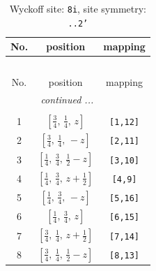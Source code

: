 \documentclass[fleqn,8pt]{jsarticle}
\begin{document}
\begin{longtable}{ccc}
\caption{Wyckoff site: {\tt 8i}, site symmetry: {\tt ..2'}}
 \\
 \hline \hline
No. & position & mapping \\ \hline \endfirsthead

\multicolumn{2}{l}{\tablename\ \thetable{}} \\
 \hline \hline
No. & position & mapping \\ \hline \endhead

 \hline \hline
\multicolumn{2}{r}{\footnotesize\it continued ...} \\ \endfoot

 \hline \hline
\multicolumn{2}{r}{} \\ \endlastfoot

1 & $\left[ \frac{3}{4},\, \frac{1}{4},\, z \right]$ & {\tt [1,12]} \\ \hline
2 & $\left[ \frac{3}{4},\, \frac{1}{4},\, - z \right]$ & {\tt [2,11]} \\ \hline
3 & $\left[ \frac{1}{4},\, \frac{3}{4},\, \frac{1}{2} - z \right]$ & {\tt [3,10]} \\ \hline
4 & $\left[ \frac{1}{4},\, \frac{3}{4},\, z + \frac{1}{2} \right]$ & {\tt [4,9]} \\ \hline
5 & $\left[ \frac{1}{4},\, \frac{3}{4},\, - z \right]$ & {\tt [5,16]} \\ \hline
6 & $\left[ \frac{1}{4},\, \frac{3}{4},\, z \right]$ & {\tt [6,15]} \\ \hline
7 & $\left[ \frac{3}{4},\, \frac{1}{4},\, z + \frac{1}{2} \right]$ & {\tt [7,14]} \\ \hline
8 & $\left[ \frac{3}{4},\, \frac{1}{4},\, \frac{1}{2} - z \right]$ & {\tt [8,13]} \\
\end{longtable}
\renewcommand{\arraystretch}{1.2}
\end{document}
